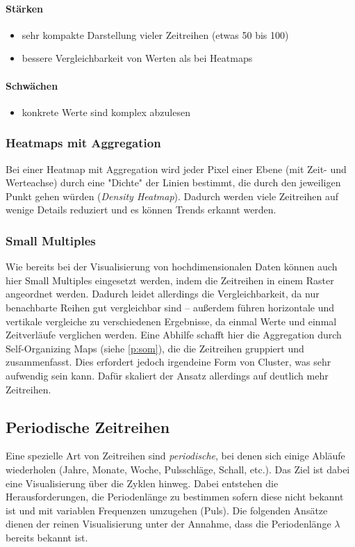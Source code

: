 				\paragraph{Stärken}
				\begin{itemize}
					\item sehr kompakte Darstellung vieler Zeitreihen (etwas 50 bis 100)
					\item bessere Vergleichbarkeit von Werten als bei Heatmaps
				\end{itemize}

				\paragraph{Schwächen}
				\begin{itemize}
					\item konkrete Werte sind komplex abzulesen
				\end{itemize}

			\subsubsection{Heatmaps mit Aggregation}
				Bei einer Heatmap mit Aggregation wird jeder Pixel einer Ebene (mit Zeit- und Werteachse) durch eine "Dichte" der Linien bestimmt, die durch den jeweiligen Punkt gehen würden (\emph{Density Heatmap}). Dadurch werden viele Zeitreihen auf wenige Details reduziert und es können Trends erkannt werden.

			\subsubsection{Small Multiples}
				Wie bereits bei der Visualisierung von hochdimensionalen Daten können auch hier Small Multiples eingesetzt werden, indem die Zeitreihen in einem Raster angeordnet werden. Dadurch leidet allerdings die Vergleichbarkeit, da nur benachbarte Reihen gut vergleichbar sind -- außerdem führen horizontale und vertikale vergleiche zu verschiedenen Ergebnisse, da einmal Werte und einmal Zeitverläufe verglichen werden. Eine Abhilfe schafft hier die Aggregation durch Self-Organizing Maps (siehe \autoref{p:som}), die die Zeitreihen gruppiert und zusammenfasst. Dies erfordert jedoch irgendeine Form von Cluster, was sehr aufwendig sein kann. Dafür skaliert der Ansatz allerdings auf deutlich mehr Zeitreihen.

		\subsection{Periodische Zeitreihen}
			Eine spezielle Art von Zeitreihen sind \emph{periodische}, bei denen sich einige Abläufe wiederholen (\zB Jahre, Monate, Woche, Pulsschläge, Schall, etc.). Das Ziel ist dabei eine Visualisierung über die Zyklen hinweg. Dabei entstehen die Herausforderungen, die Periodenlänge zu bestimmen sofern diese nicht bekannt ist und mit variablen Frequenzen umzugehen (\bspw Puls). Die folgenden Ansätze dienen der reinen Visualisierung unter der Annahme, dass die Periodenlänge \(\lambda\) bereits bekannt ist.

